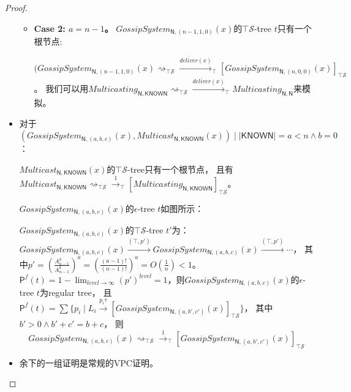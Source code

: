 \begin{proof}
\begin{itemize}
{\begin{itemize}
{            对$t$的叶子结点有$GossipSystem_{\mathsf{N},(a,n-a,0)}(x)\stackrel{\overline{deliver}(x)}{\longrightarrow}_{\top} GossipSystem_{\mathsf{N},(a+1,n-1-a,0)}(x)$。
            即
            
            $(GossipSystem_{\mathsf{N},(a,b,c)}(x)\rightsquigarrow_{\top\mathcal{S}}\stackrel{\overline{deliver}(x)}{\longrightarrow}_{\top}[GossipSystem_{\mathsf{N},(a+1,b',c')}(x)]_{\top\mathcal{S}},b'+c'=b+c-1$。

            我们可以用$Multicasting_{\mathsf{N},\mathsf{KNOWN}}\rightsquigarrow_{\top\mathcal{S}}\stackrel{\overline{deliver}(x)}{\longrightarrow}_{\top} Multicasting_{\mathsf{N}, \mathsf{KNOWN}'}$来模拟。
            }
            \item {\textbf{Case 2: $a=n-1$。}
            $GossipSystem_{\mathsf{N},(n-1,1,0)}(x)$的$\top \mathcal{S}$-tree $t$只有一个根节点:

            $(GossipSystem_{\mathsf{N},(n-1,1,0)}(x)\rightsquigarrow_{\top\mathcal{S}}\stackrel{\overline{deliver}(x)}{\longrightarrow}_{\top}[GossipSystem_{\mathsf{N},(n,0,0)}(x)]_{\top\mathcal{S}}$。
            我们可以用$Multicasting_{\mathsf{N},\mathsf{KNOWN}}\rightsquigarrow_{\top\mathcal{S}}\stackrel{\overline{deliver}(x)}{\longrightarrow}_{\top} Multicasting_{\mathsf{N}, \mathsf{N}}$来模拟。
            }
        \end{itemize}
    }
    \item {
        对于$(GossipSystem_{\mathsf{N},(a,b,c)}(x), Multicast_{\mathsf{N}, \mathsf{KNOWN}}(x))\mid |\mathsf{KNOWN}| = a < n \wedge b= 0$：

        $Multicast_{\mathsf{N}, \mathsf{KNOWN}}(x)$的$\top \mathcal{S}$-tree只有一个根节点，
        且有$Multicast_{\mathsf{N}, \mathsf{KNOWN}}\rightsquigarrow_{\top\mathcal{S}}\stackrel{1}{\rightarrow}_{\top}[Multicasting_{\mathsf{N}, \mathsf{KNOWN}}]_{\top \mathcal{S}}$。

        $GossipSystem_{\mathsf{N},(a,b,c)}(x)$的$\epsilon$-tree $t$如图所示：

        $GossipSystem_{\mathsf{N},(a,b,c)}(x)$的$\top\mathcal{S}$-tree $t'$为：
        $GossipSystem_{\mathsf{N},(a,b,c)}(x)\stackrel{(\top,p')}{\rightarrow}GossipSystem_{\mathsf{N},(a,b,c)}(x)\stackrel{(\top,p')}{\rightarrow}\cdots$，
        其中$p'= (\frac{A^k_{a-1}}{A^k_{n-1}})^a = (\frac{(a-1)!}{(n-1)!})^a = O(\frac{1}{n})<1$。
        $\mathsf{P}^f(t) = 1-\lim_{level\rightarrow \infty} (p')^{level} = 1$，则$GossipSystem_{\mathsf{N},(a,b,c)}(x)$的$\epsilon$-tree $t$为regular tree，
        且$\mathsf{P}^f(t) = \sum \{p_i\mid L_i\stackrel{p_i\tau}{\rightarrow} [GossipSystem_{\mathsf{N},(a,b',c')}(x)]_{\top \mathcal{S}}\}$，
        其中$b'>0 \wedge b'+c'=b+c$，
        则
        $$GossipSystem_{\mathsf{N},(a,b,c)}(x)\rightsquigarrow_{\top\mathcal{S}}\stackrel{1}{\rightarrow}_{\top}[GossipSystem_{\mathsf{N},(a,b',c')}(x)]_{\top \mathcal{S}}$$
    }
    \item {
        余下的一组证明是常规的VPC证明。
    }
 \end{itemize}

\end{proof}
